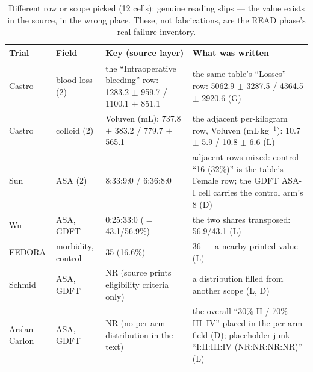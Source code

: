 \documentclass[11pt]{article}
\begin{document}
\begin{table}[H]
\centering\footnotesize
\caption{Different row or scope picked (12 cells): genuine reading slips --- the value exists in the source, in the wrong place. These, not fabrications, are the READ phase's real failure inventory.}
\setlength{\tabcolsep}{4pt}
\begin{tabular}{p{2.4cm}p{2.5cm}p{4.0cm}p{5.3cm}}
\toprule
Trial & Field & Key (source layer) & What was written \\
\midrule
Castro & blood loss (2) & the ``Intraoperative bleeding'' row: 1283.2 $\pm$ 959.7 / 1100.1 $\pm$ 851.1 & the same table's ``Losses'' row: 5062.9 $\pm$ 3287.5 / 4364.5 $\pm$ 2920.6 (G) \\
Castro & colloid (2) & Voluven (mL): 737.8 $\pm$ 383.2 / 779.7 $\pm$ 565.1 & the adjacent per-kilogram row, Voluven (mL\,kg$^{-1}$): 10.7 $\pm$ 5.9 / 10.8 $\pm$ 6.6 (L) \\
Sun & ASA (2) & 8:33:9:0 / 6:36:8:0 & adjacent rows mixed: control ``16 (32\%)'' is the table's Female row; the GDFT ASA-I cell carries the control arm's 8 (D) \\
Wu & ASA, GDFT & 0:25:33:0 ($=$ 43.1/56.9\%) & the two shares transposed: 56.9/43.1 (L) \\
FEDORA & morbidity, control & 35 (16.6\%) & 36 --- a nearby printed value (L) \\
Schmid & ASA, GDFT & NR (source prints eligibility criteria only) & a distribution filled from another scope (L, D) \\
Arslan-Carlon & ASA, GDFT & NR (no per-arm distribution in the text) & the overall ``30\% II / 70\% III--IV'' placed in the per-arm field (D); placeholder junk ``I:II:III:IV (NR:NR:NR:NR)'' (L) \\
\bottomrule
\end{tabular}
\end{table}
\end{document}
